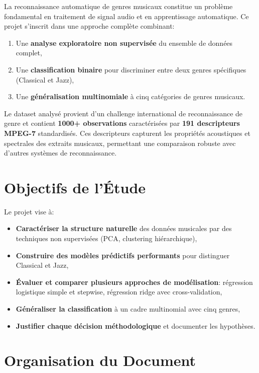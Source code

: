 \documentclass[11pt,a4paper,french]{report}
\begin{document}
La reconnaissance automatique de genres musicaux constitue un problème fondamental en traitement de signal audio et en apprentissage automatique. Ce projet s'inscrit dans une approche complète combinant:

\begin{enumerate}
    \item Une \textbf{analyse exploratoire non supervisée} du ensemble de données complet,
    \item Une \textbf{classification binaire} pour discriminer entre deux genres spécifiques (Classical et Jazz),
    \item Une \textbf{généralisation multinomiale} à cinq catégories de genres musicaux.
\end{enumerate}

Le dataset analysé provient d'un challenge international de reconnaissance de genre et contient \textbf{1000+ observations} caractérisées par \textbf{191 descripteurs MPEG-7} standardisés. Ces descripteurs capturent les propriétés acoustiques et spectrales des extraits musicaux, permettant une comparaison robuste avec d'autres systèmes de reconnaissance.

\section*{Objectifs de l'Étude}

Le projet vise à:

\begin{itemize}
    \item \textbf{Caractériser la structure naturelle} des données musicales par des techniques non supervisées (PCA, clustering hiérarchique),
    \item \textbf{Construire des modèles prédictifs performants} pour distinguer Classical et Jazz,
    \item \textbf{Évaluer et comparer plusieurs approches de modélisation}: régression logistique simple et stepwise, régression ridge avec cross-validation,
    \item \textbf{Généraliser la classification} à un cadre multinomial avec cinq genres,
    \item \textbf{Justifier chaque décision méthodologique} et documenter les hypothèses.
\end{itemize}

\section*{Organisation du Document}
\end{document}
